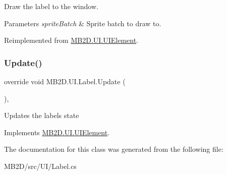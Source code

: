 Draw the label to the window. 


\begin{DoxyParams}{Parameters}
{\em sprite\+Batch} & Sprite batch to draw to.\\
\hline
\end{DoxyParams}


Reimplemented from \hyperlink{class_m_b2_d_1_1_u_i_1_1_u_i_element_afec98e6e38cb0dbc17a5db6d6a3d5ba5}{M\+B2\+D.\+U\+I.\+U\+I\+Element}.

\hypertarget{class_m_b2_d_1_1_u_i_1_1_label_ae4cc8f88f75b0d16d983bb754d214ef4}{}\label{class_m_b2_d_1_1_u_i_1_1_label_ae4cc8f88f75b0d16d983bb754d214ef4} 
\subsubsection{\texorpdfstring{Update()}{Update()}}
{\footnotesize\ttfamily override void M\+B2\+D.\+U\+I.\+Label.\+Update (\begin{DoxyParamCaption}{ }\end{DoxyParamCaption})\hspace{0.3cm}{\ttfamily [inline]}, {\ttfamily [virtual]}}



Updates the labels state 



Implements \hyperlink{class_m_b2_d_1_1_u_i_1_1_u_i_element_aa97bcbe44f3fac8a13e2febca23b2d4d}{M\+B2\+D.\+U\+I.\+U\+I\+Element}.



The documentation for this class was generated from the following file\+:\begin{DoxyCompactItemize}
\item 
M\+B2\+D/src/\+U\+I/Label.\+cs\end{DoxyCompactItemize}
